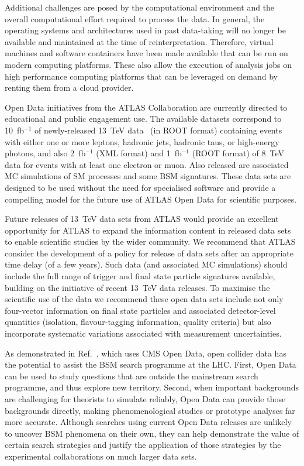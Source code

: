 \documentclass[a4paper,aps,prd,longbibliography,notitlepage,showpacs,amsmath,amssymb,superscriptaddress,nofootinbib,floatfix,11pt,preprintnumbers]{revtex4-1-mod}
\renewcommand{\root}{\textsf{ROOT}\xspace}
\begin{document}
Additional challenges are posed by the computational environment and the overall computational effort required to process the data. In general, the operating systems and architectures used in past data-taking will no longer be available and maintained at the time of reinterpretation. Therefore, virtual machines and software containers have been made available that can be run on modern computing platforms. These also allow the execution of analysis jobs on high performance computing platforms that can be leveraged on demand by renting them from a cloud provider.

Open Data initiatives from the ATLAS Collaboration are currently directed to educational
and public engagement use. The available datasets correspond to 10~fb$^{-1}$ of newly-released 13~TeV data~\cite{ATL-OREACH-PUB-2020-001} (in \root format) containing events with either one or more leptons, hadronic jets, hadronic taus, or high-energy photons, and also 2~fb$^{-1}$ (\textsf{XML} format) and 1~fb$^{-1}$ (\root format) of  8~TeV data for events with at least one electron or muon.
Also released are associated MC simulations of SM processes and some BSM signatures. These data sets are designed to be used without the need for specialised software and provide a compelling model for the future use of ATLAS Open Data for scientific purposes.


Future releases of 13~TeV data sets from ATLAS would provide an excellent opportunity
for ATLAS to expand the information content in released data sets to enable scientific studies by the wider community.
We recommend that ATLAS consider the development of a policy for release of data sets after an appropriate time delay (of a few years). Such data (and associated MC simulations) should include the full range of trigger and final state particle signatures available, building on the initiative of recent 13~TeV data releases.
To maximise the scientific use of the data we recommend these open data sets include not only four-vector information on final state particles and associated detector-level quantities (isolation, flavour-tagging information, quality criteria) but also incorporate systematic variations associated with measurement uncertainties.


As demonstrated in Ref.~\cite{Cesarotti:2019nax}, which uses CMS Open Data, open collider data has the potential to assist the BSM search programme at the LHC.
First, Open Data can be used to study questions that are outside the mainstream search programme, and thus explore new territory.
Second, when important backgrounds are challenging for theorists to simulate reliably, Open Data can provide those backgrounds directly, making phenomenological studies or prototype analyses far more accurate.
Although searches using current Open Data releases are unlikely to uncover BSM phenomena on their own, they can help demonstrate the value of certain search strategies and justify the application of those strategies by the experimental collaborations on much larger data sets.
\end{document}
